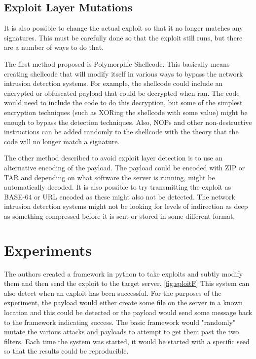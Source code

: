 \documentclass{reading_glasses}
\begin{document}
\subsection{Exploit Layer Mutations}
It is also possible to change the actual exploit so that it no longer matches any signatures.  This must be carefully done so that the exploit still runs, but there are a number of ways to do that.  \cite{vigna2004testing}

The first method proposed is Polymorphic Shellcode.  This basically means creating shellcode that will modify itself in various ways to bypass the network intrusion detection systems.  For example, the shellcode could include an encrypted or obfuscated payload that could be decrypted when ran.  The code would need to include the code to do this decryption, but some of the simplest encryption techniques (such as XORing the shellcode with some value) might be enough to bypass the detection techniques.  Also, NOPs and other non-destructive instructions can be added randomly to the shellcode with the theory that the code will no longer match a signature.  \cite{vigna2004testing}

The other method described to avoid exploit layer detection is to use an alternative encoding of the payload.  The payload could be encoded with ZIP or TAR and depending on what software the server is running, might be automatically decoded.  It is also possible to try transmitting the exploit as BASE-64 or URL encoded as these might also not be detected.  The network intrusion detection systems might not be looking for levels of indirection as deep as something compressed before it is sent or stored in some different format. \cite{vigna2004testing}

\section{Experiments}
The authors created a framework in python to take exploits and subtly modify them and then send the exploit to the target server. \ref{fig:sploitF}  This system can also detect when an exploit has been successful.  For the purposes of the experiment, the payload would either create some file on the server in a known location and this could be detected or the payload would send some message back to the framework indicating success. The basic framework would "randomly" mutate the various attacks and payloads to attempt to get them past the two filters.  Each time the system was started, it would be started with a specific seed so that the results could be reproducible. \cite{vigna2004testing}
\end{document}

